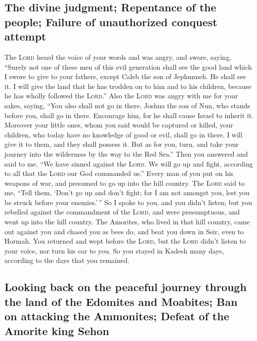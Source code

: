 \hypertarget{the-divine-judgment-repentance-of-the-people-failure-of-unauthorized-conquest-attempt}{%
\subsection{The divine judgment; Repentance of the people; Failure of
unauthorized conquest
attempt}\label{the-divine-judgment-repentance-of-the-people-failure-of-unauthorized-conquest-attempt}}

 The \textsc{Lord} heard the voice of your words and was
angry, and swore, saying,  ``Surely not one of these men
of this evil generation shall see the good land which I swore to give to
your fathers,  except Caleb the son of Jephunneh. He
shall see it. I will give the land that he has trodden on to him and to
his children, because he has wholly followed the \textsc{Lord}.''
 Also the \textsc{Lord} was angry with me for your sakes,
saying, ``You also shall not go in there.  Joshua the son
of Nun, who stands before you, shall go in there. Encourage him, for he
shall cause Israel to inherit it.  Moreover your little
ones, whom you said would be captured or killed, your children, who
today have no knowledge of good or evil, shall go in there. I will give
it to them, and they shall possess it.  But as for you,
turn, and take your journey into the wilderness by the way to the Red
Sea.''  Then you answered and said to me, ``We have
sinned against the \textsc{Lord}. We will go up and fight, according to
all that the \textsc{Lord} our God commanded us.'' Every man of you put
on his weapons of war, and presumed to go up into the hill country.
 The \textsc{Lord} said to me, ``Tell them, `Don't go up
and don't fight; for I am not amongst you, lest you be struck before
your enemies.'\,''  So I spoke to you, and you didn't
listen; but you rebelled against the commandment of the \textsc{Lord},
and were presumptuous, and went up into the hill country.
 The Amorites, who lived in that hill country, came out
against you and chased you as bees do, and beat you down in Seir, even
to Hormah.  You returned and wept before the
\textsc{Lord}, but the \textsc{Lord} didn't listen to your voice, nor
turn his ear to you.  So you stayed in Kadesh many days,
according to the days that you remained.

\hypertarget{looking-back-on-the-peaceful-journey-through-the-land-of-the-edomites-and-moabites-ban-on-attacking-the-ammonites-defeat-of-the-amorite-king-sehon}{%
\subsection{Looking back on the peaceful journey through the land of the
Edomites and Moabites; Ban on attacking the Ammonites; Defeat of the
Amorite king
Sehon}\label{looking-back-on-the-peaceful-journey-through-the-land-of-the-edomites-and-moabites-ban-on-attacking-the-ammonites-defeat-of-the-amorite-king-sehon}}

